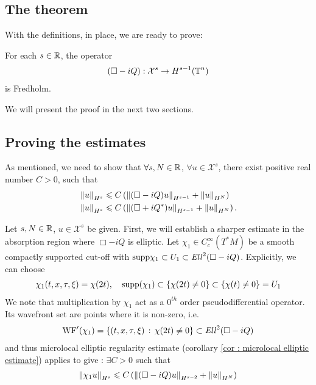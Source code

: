 \documentclass[12pt]{article}
\begin{document}
\subsection{The theorem}
With the definitions, in place, we are ready to prove: 
\begin{ftheorem}
    For each $s \in \R$, the operator
    \begin{align*}
    (\Box - iQ): \mathcal{X}^s \to H^{s - 1}(\T^n)
    \end{align*}
    is Fredholm. 
\end{ftheorem}
We will present the proof in the next two sections. 

\subsection{Proving the estimates} 

    As mentioned, we need to show that $\forall s, N \in \R$, $\forall u \in \mathcal{X}^s$, there exist positive real number $C > 0$, such that
    \begin{align} \label{eq : fredholm estimate for wave operator} 
    &\norm[u]_{H^s} \leq C \brac{ \norm[(\Box - i Q)u]_{H^{s - 1}} + \norm[u]_{H^N}} \\
    &\norm[u]_{H^s} \leq C \brac{ \norm[(\Box + i Q^*)u]_{H^{s - 1}} + \norm[u]_{H^N}}. 
    \end{align}
    
    Let $s, N \in \R$, $u \in \mathcal{X}^s$ be given. First, we will establish a sharper estimate in the absorption region where $\Box - iQ$ is elliptic. Let $\chi_1 \in C^{\infty}_c(T^*M)$ be a smooth compactly supported cut-off with $\supp \chi_1 \subset U_1 \subset \Ell^2( \Box - iQ)$. Explicitly, we can choose
    \begin{align*}
    \chi_1(t, x, \tau, \xi) = \chi(2 t), \quad \supp(\chi_1) \subset \set{\chi(2t) \neq 0} \subset \set{\chi(t) \neq 0} = U_1
    \end{align*}
    We note that multiplication by $\chi_1$ act as a $0^{th}$ order pseudodifferential operator. Its wavefront set are points where it is non-zero, i.e. 
    \begin{align*}
    \WF'(\chi_1) = \set{(t, x, \tau, \xi) \wh \chi(2t) \neq 0 } \subset \Ell^2(\Box - iQ)
    \end{align*}
    and thus microlocal elliptic regularity estimate (corollary \ref{cor : microlocal elliptic estimate}) applies to give  : $\exists C > 0$ such that
    \begin{align}
    \norm[\chi_1 u]_{H^s} \leq C \brac{\norm[(\Box - iQ)u ]_{H^{s - 2}} + \norm[u]_{H^N}} \label{eq: estimate in elliptic set}
    \end{align}
    
\end{document}
